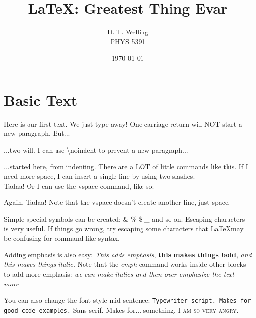 \documentclass[12pt, letterpaper]{article}
\begin{document}
\title{\LaTeX: Greatest Thing Evar}
\author{D. T. Welling\\PHYS 5391} %
\date{\today}  %

\maketitle
\newpage
\tableofcontents
\newpage


\linenumbers

\section{Basic Text}


Here is our first text.  We just type away!
One carriage return will NOT start a new paragraph.  But...

...two will.  I can use \textbackslash noindent to prevent a new paragraph...

\noindent
...started here, from indenting.  There are a LOT of little commands like this.
If I need more space, I can insert a single line by using two slashes.
\\

Tadaa!  Or I can use the vspace command, like so:
\vspace{4mm}

Again, Tadaa!  Note that the vspace doesn't create another line, just space.

Simple special symbols can be created: \& \% \$ \_ and so on.  Escaping
characters is very useful.  If things go wrong, try escaping some characters
that \LaTeX may be confusing for command-like syntax.

Adding emphasis is also easy: \emph{This adds emphasis}, \textbf{this makes
things bold}, \textit{and this makes things italic.}  Note that the 
\textit{emph} command works inside other blocks to add more emphasis:
\textit{we can make italics and then \emph{over emphasize} the text more.}

You can also change the font style mid-sentence:
\texttt{Typewriter script.  Makes for good code examples.}
\textsf{Sans serif.  Makes for... something.}
\textsc{I am so very angry.}
\end{document}
